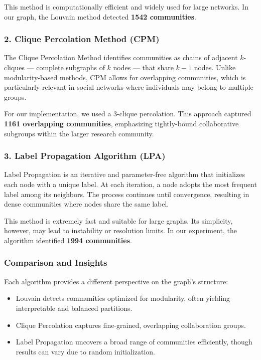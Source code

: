 \documentclass[12pt]{article}
\begin{document}
This method is computationally efficient and widely used for large networks. In our graph, the Louvain method detected \textbf{1542 communities}.

\subsubsection*{2. Clique Percolation Method (CPM)}

The Clique Percolation Method identifies communities as chains of adjacent $k$-cliques — complete subgraphs of $k$ nodes — that share $k-1$ nodes. Unlike modularity-based methods, CPM allows for overlapping communities, which is particularly relevant in social networks where individuals may belong to multiple groups.

For our implementation, we used a 3-clique percolation. This approach captured \textbf{1161 overlapping communities}, emphasizing tightly-bound collaborative subgroups within the larger research community.

\subsubsection*{3. Label Propagation Algorithm (LPA)}

Label Propagation is an iterative and parameter-free algorithm that initializes each node with a unique label. At each iteration, a node adopts the most frequent label among its neighbors. The process continues until convergence, resulting in dense communities where nodes share the same label.

This method is extremely fast and suitable for large graphs. Its simplicity, however, may lead to instability or resolution limits. In our experiment, the algorithm identified \textbf{1994 communities}.

\subsubsection*{Comparison and Insights}

Each algorithm provides a different perspective on the graph’s structure:
\begin{itemize}
    \item Louvain detects communities optimized for modularity, often yielding interpretable and balanced partitions.
    \item Clique Percolation captures fine-grained, overlapping collaboration groups.
    \item Label Propagation uncovers a broad range of communities efficiently, though results can vary due to random initialization.
\end{itemize}
\end{document}
